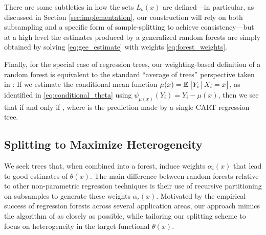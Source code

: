 \documentclass[aos]{imsart}
\theoremstyle{plain}
\theoremstyle{definition}
\theoremstyle{remark}
\begin{document}
\begin{CJK}{UTF8}{gbsn}
{There are some subtleties in how the sets $L_b(x)$ are defined---in particular,
as discussed in Section \ref{sec:implementation}, our construction will rely on both
subsampling and a specific form of sample-splitting to achieve consistency---but at a high level
the estimates  produced by a generalized random forests are simply
obtained by solving \eqref{eq:gee_estimate} with weights \eqref{eq:forest_weights}.

Finally, for the special case of regression trees, our weighting-based definition of a random forest is equivalent
to the standard ``average of trees'' perspective taken in \citet{breiman2001random}:
If we estimate the conditional mean function $\mu(x) = \mathbb{E}_{}\left[Y_i \,\big|\, X_i = x\right]$, as
identified in \eqref{eq:conditional_theta} using
$\psi_{\mu(x)}(Y_i) = Y_i - \mu(x)$, then we see that
if and only if
,
where  is the
prediction made by a single CART regression tree.

\subsection{Splitting to Maximize Heterogeneity}

We seek trees that, when combined into a forest, induce weights
$\alpha_i(x)$ that lead to good estimates of $\theta(x)$. The main difference between
random forests relative to other non-parametric regression techniques
is their use of recursive partitioning on subsamples to generate these weights $\alpha_i(x)$.
Motivated by the empirical success of regression forests across several application areas, our approach
mimics the algorithm of \citet{breiman2001random} as closely as possible, while tailoring
our splitting scheme to focus on heterogeneity in the target functional $\theta(x)$.

}
\end{CJK}
\end{document}
